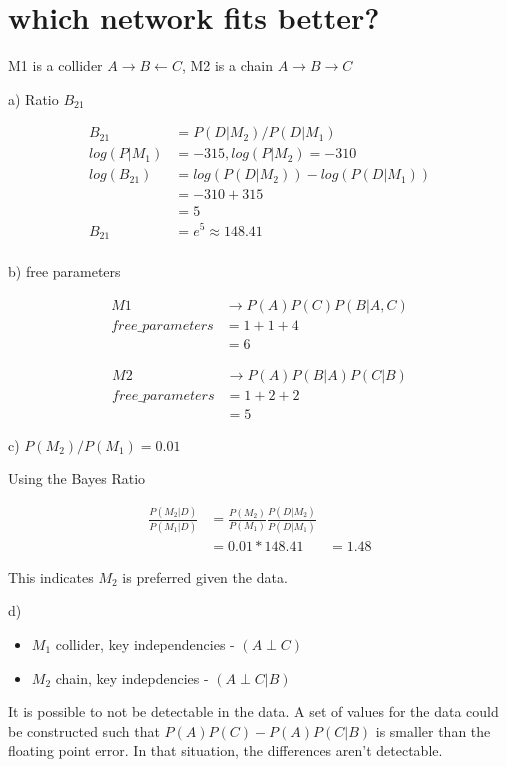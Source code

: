 \documentclass[11pt]{article}
\begin{document}
\section{which network fits better?}

M1 is a collider ${A \rightarrow B \leftarrow C}$, M2 is a chain ${A \rightarrow B \rightarrow C}$

a) Ratio ${B_{21}}$

\begin{align*}
	B_{21} &= P(D|M_2)/P(D|M_1) \\
	log(P|M_1) &= -315, log(P|M_2) = -310 \\
	log(B_{21}) &= log(P(D|M_2)) - log(P(D|M_1)) \\
	&= -310 + 315 \\
	&= 5 \\
	B_{21} &= e^5 \approx 148.41 \\
\end{align*}

b) free parameters

\begin{align*}
  M1 & \rightarrow P(A)P(C)P(B|A,C)\\
  free\_parameters &= 1 + 1 + 4 \\
      &= 6
\end{align*}

\begin{align*}
	M2 & \rightarrow P(A)P(B|A)P(C|B)\\
	free\_parameters &= 1 + 2 + 2 \\
	&= 5
\end{align*}

c) ${P(M_2)/P(M_1) = 0.01}$

Using the Bayes Ratio

\begin{align*}
	\frac{P(M_2|D)}{P(M_1|D)} &= \frac{P(M_2)}{P(M_1)} \frac{P(D|M_2)}{P(D|M_1)}\\
	&= 0.01 * 148.41
	&= 1.48
\end{align*}

This indicates ${M_2}$ is preferred given the data.

d)
\begin{itemize}
	\item ${M_1}$ collider, key independencies - ${(A \perp C)}$
	\item ${M_2}$ chain, key indepdencies - ${(A \perp C | B)}$
\end{itemize}

It is possible to not be detectable in the data. A set of values for the data could be constructed such that ${P(A)P(C) - P(A)P(C|B)}$ is smaller than the floating point error. In that situation, the differences aren't detectable.
\end{document}
